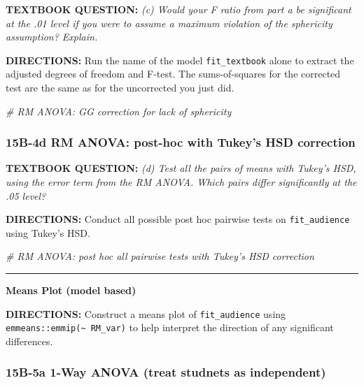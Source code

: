 \documentclass[]{article}
\newenvironment{Shaded}{\begin{snugshade}}{\end{snugshade}}
\newcommand{\CommentTok}[1]{\textcolor[rgb]{0.56,0.35,0.01}{\textit{#1}}}
\begin{document}
\textbf{TEXTBOOK QUESTION:} \emph{(c) Would your F ratio from part a be
significant at the .01 level if you were to assume a maximum violation
of the sphericity assumption? Explain. }

\textbf{DIRECTIONS:} Run the name of the model \texttt{fit\_textbook}
alone to extract the adjusted degrees of freedom and F-test. The
sums-of-squares for the corrected test are the same as for the
uncorrected you just did.

\begin{Shaded}
\begin{Highlighting}[]
\CommentTok{# RM ANOVA: GG correction for lack of sphericity}
\end{Highlighting}
\end{Shaded}

\clearpage

\subsubsection{15B-4d RM ANOVA: post-hoc with Tukey's HSD
correction}\label{b-4d-rm-anova-post-hoc-with-tukeys-hsd-correction}

\textbf{TEXTBOOK QUESTION:} \emph{(d) Test all the pairs of means with
Tukey's HSD, using the error term from the RM ANOVA. Which pairs differ
significantly at the .05 level?}

\textbf{DIRECTIONS:} Conduct all possible post hoc pairwise tests on
\texttt{fit\_audience} using Tukey's HSD.

\begin{Shaded}
\begin{Highlighting}[]
\CommentTok{# RM ANOVA: post hoc all pairwise tests with Tukey's HSD correction}
\end{Highlighting}
\end{Shaded}

\begin{center}\rule{0.5\linewidth}{\linethickness}\end{center}

\textbf{Means Plot (model based)}

\textbf{DIRECTIONS:} Construct a means plot of \texttt{fit\_audience}
using \texttt{emmeans::emmip(\textasciitilde{}\ RM\_var)} to help
interpret the direction of any significant differences.

\clearpage

\subsubsection{15B-5a 1-Way ANOVA (treat studnets as
independent)}\label{b-5a-1-way-anova-treat-studnets-as-independent}
\end{document}
